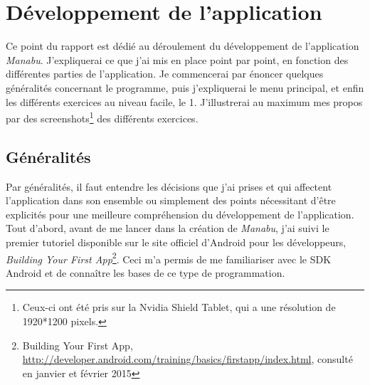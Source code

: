 \section{Développement de l'application}
Ce point du rapport est dédié au déroulement du développement de l'application \textit{Manabu}. J'expliquerai ce que j'ai mis en place point par point, en fonction des différentes parties de l'application. Je commencerai par énoncer quelques généralités concernant le programme, puis j'expliquerai le menu principal, et enfin les différents exercices au niveau facile, le 1. J'illustrerai au maximum mes propos par des screenshots\footnote{Ceux-ci ont été pris sur la Nvidia Shield Tablet, qui a une résolution de 1920*1200 pixels.} des différents exercices.

\subsection{Généralités}
Par généralités, il faut entendre les décisions que j'ai prises et qui affectent l'application dans son ensemble ou simplement des points nécessitant d'être explicités pour une meilleure compréhension du développement de l'application.\\

Tout d'abord, avant de me lancer dans la création de \textit{Manabu}, j'ai suivi le premier tutoriel disponible sur le site officiel d'Android pour les développeurs, \textit{Building Your First App}\footnote{Building Your First App, \url{http://developer.android.com/training/basics/firstapp/index.html}, consulté en janvier et février 2015}. Ceci m'a permis de me familiariser avec le SDK Android et de connaître les bases de ce type de programmation.\\

